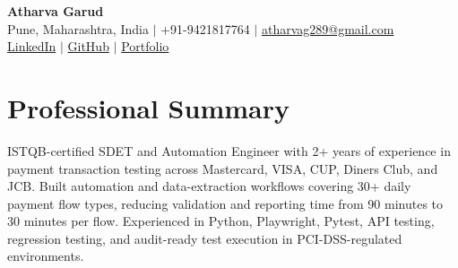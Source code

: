 \documentclass[a4paper,9.5pt]{article}
\begin{document}
\begin{center}
{\Large \textbf{Atharva Garud}}\\
\vspace{2pt}
Pune, Maharashtra, India $|$ +91-9421817764 $|$ \href{mailto:atharvag289@gmail.com}{atharvag289@gmail.com}\\
\href{https://linkedin.com/in/atharva-garud}{LinkedIn} $|$
\href{https://github.com/Atharvagarud137}{GitHub} $|$
\href{https://atharvagarud137.github.io/}{Portfolio}
\end{center}
\vspace{-4pt}
\section{Professional Summary}
\small
ISTQB-certified SDET and Automation Engineer with 2+ years of experience in payment transaction testing across Mastercard, VISA, CUP, Diners Club, and JCB. Built automation and data-extraction workflows covering 30+ daily payment flow types, reducing validation and reporting time from 90 minutes to 30 minutes per flow. Experienced in Python, Playwright, Pytest, API testing, regression testing, and audit-ready test execution in PCI-DSS-regulated environments.
\end{document}
